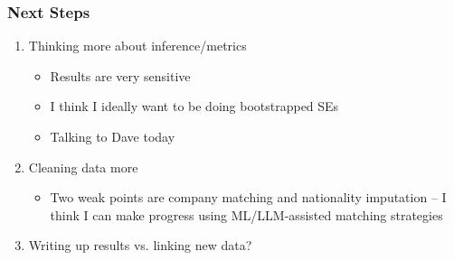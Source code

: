 \documentclass[xcolor=dvipsnames, compress, 12pt, aspectratio=169, handout]{beamer}
\begin{document}
\begin{frame}
    \frametitle{Next Steps}
    \begin{enumerate}
        \item Thinking more about inference/metrics 
        \begin{itemize}
            \item Results are very sensitive
            \item I think I ideally want to be doing bootstrapped SEs
            \item Talking to Dave today
        \end{itemize}
        \item Cleaning data more
        \begin{itemize}
            \item Two weak points are company matching and nationality imputation -- I think I can make progress using ML/LLM-assisted matching strategies 
        \end{itemize}
        \item Writing up results vs. linking new data?
    \end{enumerate}
\end{frame}
\end{document}
